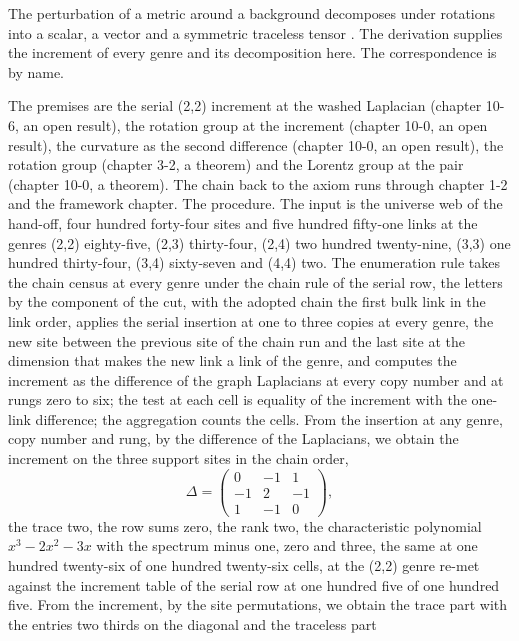 \begin{chbridge}
The perturbation of a metric around a background decomposes under rotations into a scalar, a vector and a symmetric traceless tensor \cite{Weinberg1965,Feynman1963}. The derivation supplies the increment of every genre and its decomposition here. The correspondence is by name.
\end{chbridge}
\begin{chproof}
The premises are the serial (2,2) increment at the washed Laplacian (chapter 10-6, an open result), the rotation group at the increment (chapter 10-0, an open result), the curvature as the second difference (chapter 10-0, an open result), the rotation group (chapter 3-2, a theorem) and the Lorentz group at the pair (chapter 10-0, a theorem). The chain back to the axiom runs through chapter 1-2 and the framework chapter. The procedure. The input is the universe web of the hand-off, four hundred forty-four sites and five hundred fifty-one links at the genres (2,2) eighty-five, (2,3) thirty-four, (2,4) two hundred twenty-nine, (3,3) one hundred thirty-four, (3,4) sixty-seven and (4,4) two. The enumeration rule takes the chain census at every genre under the chain rule of the serial row, the letters by the component of the cut, with the adopted chain the first bulk link in the link order, applies the serial insertion at one to three copies at every genre, the new site between the previous site of the chain run and the last site at the dimension that makes the new link a link of the genre, and computes the increment as the difference of the graph Laplacians at every copy number and at rungs zero to six; the test at each cell is equality of the increment with the one-link difference; the aggregation counts the cells. From the insertion at any genre, copy number and rung, by the difference of the Laplacians, we obtain the increment on the three support sites in the chain order,
\begin{equation}
\Delta = \begin{pmatrix} 0 & -1 & 1 \\ -1 & 2 & -1 \\ 1 & -1 & 0 \end{pmatrix} ,
\end{equation}
the trace two, the row sums zero, the rank two, the characteristic polynomial $x^{3} - 2x^{2} - 3x$ with the spectrum minus one, zero and three, the same at one hundred twenty-six of one hundred twenty-six cells, at the (2,2) genre re-met against the increment table of the serial row at one hundred five of one hundred five. From the increment, by the site permutations, we obtain the trace part with the entries two thirds on the diagonal and the traceless part

\end{chproof}
